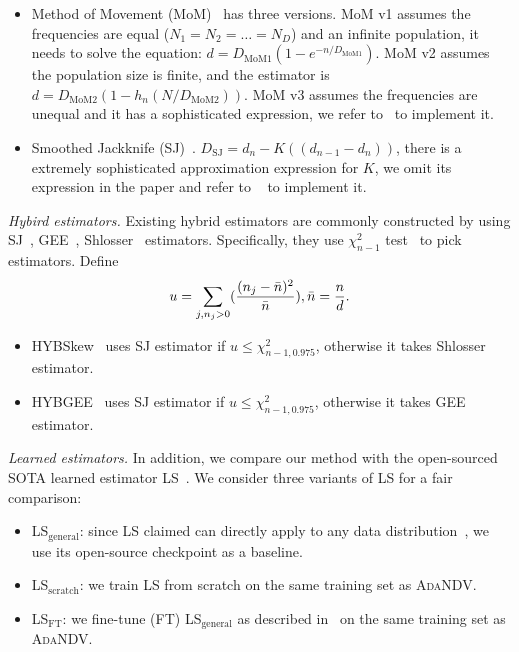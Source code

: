 \begin{itemize}[leftmargin=10pt]
\item Method of Movement (MoM)~\cite{mmo_bunge1993estimating} has three versions. MoM v1 assumes the frequencies are equal ($N_1=N_2=\ldots=N_D$) and an infinite population, it needs to solve the equation: $d=D_{\mathrm{MoM1}}(1-e^{-n/D_{\mathrm{MoM1}}})$. MoM v2 assumes the population size is finite, and the estimator is $d=D_{\mathrm{MoM2}}(1-h_n(N/D_{\mathrm{MoM2}}))$. MoM v3 assumes the frequencies are unequal and it has a sophisticated expression, we refer to~\cite{ndvlib} to implement it.
\item Smoothed Jackknife (SJ)~\cite{hybskew_haas1995sampling}. $D_{\mathrm{SJ}}=d_n-K((d_{n-1}-d_n))$, there is a extremely sophisticated approximation expression for $K$, we omit its expression in the paper and refer to ~\cite{ndvlib} to implement it.
\end{itemize}







\noindent\textit{Hybird estimators.} Existing hybrid estimators are commonly constructed by using SJ~\cite{hybskew_haas1995sampling}, GEE~\cite{gee_charikar2000towards}, Shlosser~\cite{shlosser1981estimation} estimators. Specifically, they use $\chi^2_{n-1}$ test~\cite{chi2test} to pick estimators. Define 
\begin{align}
u=\sum_{j,n_j>0}(\frac{(n_j-\Bar{n})^2}{\Bar{n}}),\Bar{n}=\frac{n}{d}.
\end{align}
\begin{itemize}[leftmargin=10pt]
\item HYBSkew~\cite{hybskew_haas1995sampling} uses SJ estimator if $u\leq \chi^2_{n-1,0.975}$, otherwise it takes Shlosser estimator.
\item HYBGEE~\cite{gee_charikar2000towards} uses SJ estimator if $u\leq \chi^2_{n-1,0.975}$, otherwise it takes GEE estimator.
\end{itemize}




\noindent\textit{Learned estimators.}
In addition, we compare our method with the open-sourced SOTA learned estimator LS~\cite{ls_wu2022learning}. We consider three variants of LS for a fair comparison:


\begin{itemize}[leftmargin=10pt]
\item LS$_{\mathrm{general}}$: since LS claimed can directly apply to any data distribution~\cite{ls_wu2022learning}, we use its open-source checkpoint as a baseline.
\item LS$_{\mathrm{scratch}}$: we train LS from scratch on the same training set as \textsc{AdaNDV}.
\item LS$_{\mathrm{FT}}$: we fine-tune (FT) LS$_{\mathrm{general}}$ as described in~\cite{ls_wu2022learning} on the same training set as \textsc{AdaNDV}.
\end{itemize}

